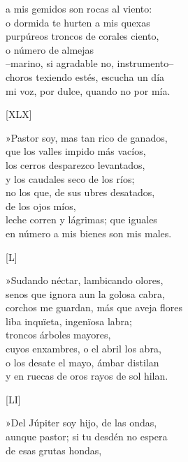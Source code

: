 \documentclass[11pt,a4paper,twoside]{article}
\begin{document}
a mis gemidos son rocas al viento:\\
o dormida te hurten a mis quexas\\
purpúreos troncos de corales ciento,\\
o  número de almejas\\
--marino, si agradable no, instrumento--\\
choros texiendo estés, escucha un día\\
mi voz, por dulce, quando no por mía.\par\pend
%
\begin{center}
	[XLX]
\end{center}\pstart
»Pastor soy, mas tan rico de ganados,\\
que los valles impido más vacíos,\\
los cerros desparezco levantados,\\
y los caudales seco de los ríos;\\
no los que, de sus ubres desatados,\\
 de los ojos míos,\\
leche corren y lágrimas; que iguales\\
en número a mis bienes son mis males.\par\pend
%
\begin{center}
	[L]
\end{center}\pstart
»Sudando néctar, lambicando olores,\\
senos que ignora aun la golosa cabra,\\
corchos me guardan, más que aveja flores\\
liba inquïeta, ingenïosa labra;\\
troncos  árboles mayores,\\
cuyos enxambres, o el abril los abra,\\
o los desate el mayo, ámbar distilan\\
y en ruecas de oros rayos de sol hilan.\par\pend
%
\begin{center}
	[LI]
\end{center}\pstart
»Del Júpiter soy hijo, de las ondas,\\
aunque pastor; si tu desdén no espera\\
 de esas grutas hondas,\\
\end{document}
